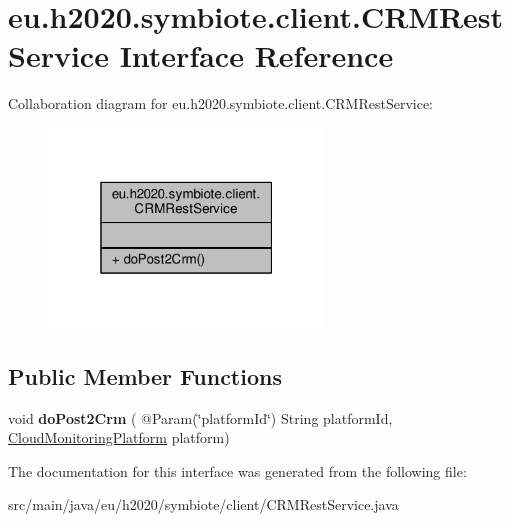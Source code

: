 \hypertarget{interfaceeu_1_1h2020_1_1symbiote_1_1client_1_1CRMRestService}{}\section{eu.\+h2020.\+symbiote.\+client.\+C\+R\+M\+Rest\+Service Interface Reference}
\label{interfaceeu_1_1h2020_1_1symbiote_1_1client_1_1CRMRestService}


Collaboration diagram for eu.\+h2020.\+symbiote.\+client.\+C\+R\+M\+Rest\+Service\+:
\nopagebreak
\begin{figure}[H]
\begin{center}
\leavevmode
\includegraphics[width=208pt]{interfaceeu_1_1h2020_1_1symbiote_1_1client_1_1CRMRestService__coll__graph}
\end{center}
\end{figure}
\subsection*{Public Member Functions}
\begin{DoxyCompactItemize}
\item 
\mbox{\label{interfaceeu_1_1h2020_1_1symbiote_1_1client_1_1CRMRestService_a76472b7b18053e469e940877f2b53a93}} 
void {\bfseries do\+Post2\+Crm} ( @Param(\char`\"{}platform\+Id\char`\"{}) String platform\+Id, \hyperlink{classeu_1_1h2020_1_1symbiote_1_1cloud_1_1monitoring_1_1model_1_1CloudMonitoringPlatform}{Cloud\+Monitoring\+Platform} platform)
\end{DoxyCompactItemize}


The documentation for this interface was generated from the following file\+:\begin{DoxyCompactItemize}
\item 
src/main/java/eu/h2020/symbiote/client/C\+R\+M\+Rest\+Service.\+java\end{DoxyCompactItemize}
